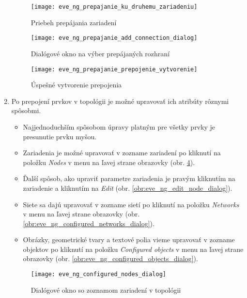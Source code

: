 \begin{enumerate}[noitemsep]
\begin{figure}
        \centering
        \texttt{[image: eve\_ng\_prepajanie\_ku\_druhemu\_zariadeniu]}
        \caption{Priebeh prepájania zariadení}
        \label{obr:eve_ng_prepajanie_ku_druhemu_zariadeniu}
    \end{figure}
    
    \begin{figure}
        \centering
        \texttt{[image: eve\_ng\_prepajanie\_add\_connection\_dialog]}
        \caption{Dialógové okno na výber prepájaných rozhraní}
        \label{obr:eve_ng_prepajanie_add_connection_dialog}
    \end{figure}
    
    \begin{figure}
        \centering
        \texttt{[image: eve\_ng\_prepajanie\_prepojenie\_vytvorenie]}
        \caption{Úspešné vytvorenie prepojenia}
        \label{obr:eve_ng_prepajanie_prepojenie_vytvorenie}
    \end{figure}
    
    \item Po prepojení prvkov v topológii je možné upravovať ich atribúty rôznymi spôsobmi.
    
    \begin{itemize}[noitemsep]
        \item Najjednoduchším spôsobom úpravy platným pre všetky prvky je presunutie prvku myšou.
        \item Zariadenia je možné upravovať v zozname zariadení po kliknutí na položku \emph{Nodes} v menu na ľavej strane obrazovky (obr. \ref{obr:eve_ng_configured_nodes_dialog}).
        \item Ďalší spôsob, ako upraviť parametre zariadenia je pravým kliknutím na zariadenie a kliknutím na \emph{Edit} (obr. \ref{obr:eve_ng_edit_node_dialog}).
        \item Siete sa dajú upravovať v zozname sietí po kliknutí na položku \emph{Networks} v menu na ľavej strane obrazovky (obr. \ref{obr:eve_ng_configured_networks_dialog}).
        \item Obrázky, geometrické tvary a textové polia vieme upravovať v zozname objektov po kliknutí na položku \emph{Configured objects} v menu na ľavej strane obrazovky (obr. \ref{obr:eve_ng_configured_objects_dialog}).
    \end{itemize}

\begin{figure}
    \centering
    \texttt{[image: eve\_ng\_configured\_nodes\_dialog]}
    \caption{Dialógové okno so zoznamom zariadení v topológii}
    \label{obr:eve_ng_configured_nodes_dialog}
\end{figure}


\end{enumerate}
